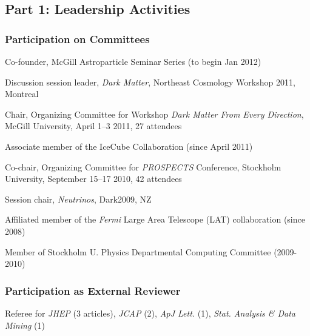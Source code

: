 \documentclass[10pt,oneside,twocolumn,a4paper]{article}
\author{Pat Scott}
\date{}
\newenvironment{packed_itemize}{
\begin{itemize}
  \setlength{\itemsep}{1.5pt}
  \setlength{\parskip}{0pt}
  \setlength{\parsep}{0pt}
}{\end{itemize}}
\begin{document}
\vspace{-5mm}
\subsection*{Part 1: Leadership Activities}

\subsubsection*{Participation on Committees}
\begin{packed_itemize}
\item Co-founder, McGill Astroparticle Seminar Series (to begin Jan 2012) 
\item Discussion session leader, \textit{Dark Matter}, Northeast Cosmology Workshop 2011, Montreal
\item Chair, Organizing Committee for Workshop \textit{Dark Matter From Every Direction}, McGill University, April 1--3 2011, 27 attendees
\item Associate member of the IceCube Collaboration (since April 2011)
\item Co-chair, Organizing Committee for \textit{PROSPECTS} Conference, Stockholm University, September 15--17 2010, 42 attendees
\item Session chair, \textit{Neutrinos}, Dark2009, NZ
\item Affiliated member of the \textit{Fermi} Large Area Telescope (LAT) collaboration (since 2008)
\item Member of Stockholm U. Physics Departmental Computing Committee (2009-2010)
\end{packed_itemize}

\vspace{-5mm}
\subsubsection*{Participation as External Reviewer}
\begin{packed_itemize}
\item Referee for \textit{JHEP} (3 articles), \textit{JCAP} (2), \textit{ApJ Lett.} (1), \textit{Stat. Analysis \& Data Mining} (1)
\end{packed_itemize}

\vspace{-5mm}
\end{document}
